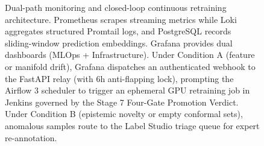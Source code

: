 \begin{figure}[htbp]
    \caption{Dual-path monitoring and closed-loop continuous retraining architecture. Prometheus scrapes streaming metrics while Loki aggregates structured Promtail logs, and PostgreSQL records sliding-window prediction embeddings. Grafana provides dual dashboards (MLOps + Infrastructure). Under Condition A (feature or manifold drift), Grafana dispatches an authenticated webhook to the FastAPI relay (with 6h anti-flapping lock), prompting the Airflow 3 scheduler to trigger an ephemeral GPU retraining job in Jenkins governed by the Stage 7 Four-Gate Promotion Verdict. Under Condition B (epistemic novelty or empty conformal sets), anomalous samples route to the Label Studio triage queue for expert re-annotation.}
    \label{fig:alertmanager_dual_routing}
\end{figure}

